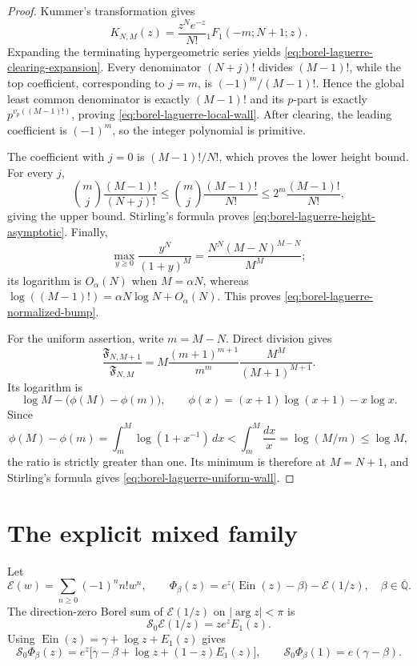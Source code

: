 \documentclass[11pt]{article}
\theoremstyle{definition}
\theoremstyle{remark}
\newcommand{\Qb}{\overline{\mathbb Q}}
\newcommand{\Ein}{\operatorname{Ein}}
\newcommand{\Eul}{\mathcal E}
\begin{document}
\begin{proof}
Kummer's transformation gives
\[
 K_{N,M}(z)=\frac{z^Ne^{-z}}{N!}
 {}_1F_1(-m;N+1;z).
\]
Expanding the terminating hypergeometric series yields
\eqref{eq:borel-laguerre-clearing-expansion}.  Every denominator
$(N+j)!$ divides $(M-1)!$, while the top coefficient, corresponding to
$j=m$, is $(-1)^m/(M-1)!$.  Hence the global least common denominator is
exactly $(M-1)!$ and its $p$-part is exactly
$p^{v_p((M-1)!)}$, proving \eqref{eq:borel-laguerre-local-wall}.
After clearing, the leading coefficient is $(-1)^m$, so the integer
polynomial is primitive.

The coefficient with $j=0$ is $(M-1)!/N!$, which proves the lower height
bound.  For every $j$,
\[
 \binom mj\frac{(M-1)!}{(N+j)!}
 \leq\binom mj\frac{(M-1)!}{N!}
 \leq2^m\frac{(M-1)!}{N!},
\]
giving the upper bound.  Stirling's formula proves
\eqref{eq:borel-laguerre-height-asymptotic}.  Finally,
\[
 \max_{y\geq0}\frac{y^N}{(1+y)^M}
 =\frac{N^N(M-N)^{M-N}}{M^M};
\]
its logarithm is $O_\alpha(N)$ when $M=\alpha N$, whereas
$\log((M-1)!)=\alpha N\log N+O_\alpha(N)$.  This proves
\eqref{eq:borel-laguerre-normalized-bump}.

For the uniform assertion, write $m=M-N$.  Direct division gives
\[
 \frac{\mathfrak F_{N,M+1}}{\mathfrak F_{N,M}}
 =M\frac{(m+1)^{m+1}}{m^m}
   \frac{M^M}{(M+1)^{M+1}}.
\]
Its logarithm is
\[
 \log M-\bigl(\phi(M)-\phi(m)\bigr),
 \qquad
 \phi(x)=(x+1)\log(x+1)-x\log x.
\]
Since
\[
 \phi(M)-\phi(m)
 =\int_m^M\log(1+x^{-1})\,dx
 <\int_m^M\frac{dx}{x}
 =\log(M/m)\leq\log M,
\]
the ratio is strictly greater than one.  Its minimum is therefore at
$M=N+1$, and Stirling's formula gives
\eqref{eq:borel-laguerre-uniform-wall}.
\end{proof}

\section{The explicit mixed family}\label{sec:mixed}

Let
\[
 \Eul(w)=\sum_{n\ge0}(-1)^nn!w^n,
 \qquad
 \Phi_\beta(z)=e^z\bigl(\Ein(z)-\beta\bigr)-\Eul(1/z),
 \quad \beta\in\Qb.
\]
The direction-zero Borel sum of \(\Eul(1/z)\) on \(|\arg z|<\pi\) is
\[
 \mathcal S_0\Eul(1/z)=ze^zE_1(z).
\]
Using \(\Ein(z)=\gamma+\log z+E_1(z)\) gives
\begin{equation}\label{eq:mixed-sum}
 \mathcal S_0\Phi_\beta(z)
 =e^z\bigl[\gamma-\beta+\log z+(1-z)E_1(z)\bigr],
\qquad
 \mathcal S_0\Phi_\beta(1)=e(\gamma-\beta).
\end{equation}
\end{document}
